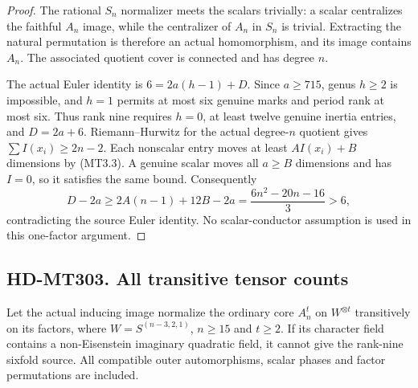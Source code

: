 \begin{proof}
The rational $S_n$ normalizer meets the scalars trivially:
a scalar centralizes the faithful $A_n$ image, while
the centralizer of $A_n$ in $S_n$ is trivial. Extracting
the natural permutation is therefore an actual homomorphism,
and its image contains $A_n$. The associated quotient
cover is connected and has degree $n$.

The actual Euler identity is $6=2a(h-1)+D$.
Since $a\ge715$, genus $h\ge2$ is impossible, and
$h=1$ permits at most six genuine marks and period rank
at most six. Thus rank nine requires $h=0$, at least
twelve genuine inertia entries, and $D=2a+6$.
Riemann--Hurwitz for the actual degree-$n$ quotient gives
$\sum I(x_i)\ge2n-2$.
Each nonscalar entry moves at least $AI(x_i)+B$ dimensions
by (MT3.3). A genuine scalar moves all $a\ge B$ dimensions
and has $I=0$, so it satisfies the same bound.
Consequently
\[
 D-2a\ge2A(n-1)+12B-2a
       =\frac{6n^2-20n-16}{3}>6,                         \tag{MT3.10}
\]
contradicting the source Euler identity. No scalar-conductor
assumption is used in this one-factor argument.
\end{proof}

\subsection*{HD-MT303. All transitive tensor counts}

\begin{theorem}[HD-MT303]
Let the actual inducing image normalize the ordinary core
$A_n^t$ on $W^{\otimes t}$ transitively on its factors,
where $W=S^{(n-3,2,1)}$, $n\ge15$ and $t\ge2$.
If its character field contains a non-Eisenstein imaginary
quadratic field, it cannot give the rank-nine sixfold source.
All compatible outer automorphisms, scalar phases and
factor permutations are included.
\end{theorem}

